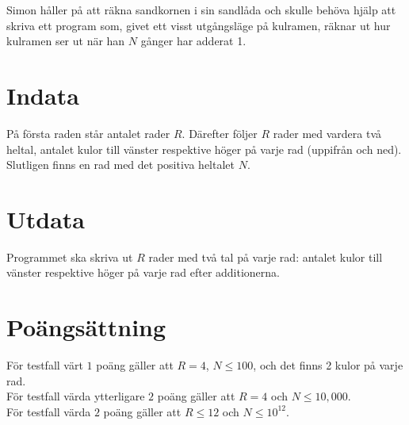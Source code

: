 Simon håller på att räkna sandkornen i sin sandlåda och skulle behöva hjälp
att skriva ett program som, givet ett visst utgångsläge på kulramen,
räknar ut hur kulramen ser ut när han $N$ gånger har adderat
1.

\section*{Indata}
På första raden står antalet rader $R$. Därefter följer $R$ rader med vardera två heltal, antalet kulor
till vänster respektive höger på varje rad (uppifrån och ned). Slutligen finns en rad med 
det positiva heltalet $N$. 

\section*{Utdata} 

Programmet ska skriva ut $R$ rader med två tal på
varje rad: antalet kulor till vänster respektive höger på varje rad
efter additionerna.

\section*{Poängsättning}

För testfall värt $1$ poäng gäller att $R=4$,  $N\le 100$, och det finns 2 kulor
på varje rad.\\
För testfall värda ytterligare $2$ poäng gäller att $R=4$ och $N\le 10,000$.\\
För testfall värda $2$ poäng gäller att $R\le 12$ och $N\le 10^{12}$.


